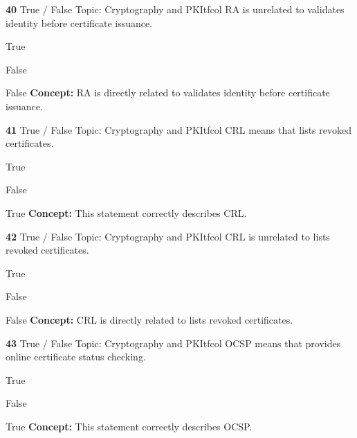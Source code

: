 \documentclass[10pt,a4paper]{article}
\begin{document}
\begin{qcard}{\color{white}\textbf{40} \hfill \small True / False \textbar{} Topic: Cryptography and PKI}{tfcol}
RA is unrelated to validates identity before certificate issuance.

\begin{qoptions}
\item True
\item False
\end{qoptions}
\begin{explainbox}{False}
\textbf{Concept:} RA is directly related to validates identity before certificate issuance.
\end{explainbox}
\end{qcard}

\begin{qcard}{\color{white}\textbf{41} \hfill \small True / False \textbar{} Topic: Cryptography and PKI}{tfcol}
CRL means that lists revoked certificates.

\begin{qoptions}
\item True
\item False
\end{qoptions}
\begin{explainbox}{True}
\textbf{Concept:} This statement correctly describes CRL.
\end{explainbox}
\end{qcard}

\begin{qcard}{\color{white}\textbf{42} \hfill \small True / False \textbar{} Topic: Cryptography and PKI}{tfcol}
CRL is unrelated to lists revoked certificates.

\begin{qoptions}
\item True
\item False
\end{qoptions}
\begin{explainbox}{False}
\textbf{Concept:} CRL is directly related to lists revoked certificates.
\end{explainbox}
\end{qcard}

\begin{qcard}{\color{white}\textbf{43} \hfill \small True / False \textbar{} Topic: Cryptography and PKI}{tfcol}
OCSP means that provides online certificate status checking.

\begin{qoptions}
\item True
\item False
\end{qoptions}
\begin{explainbox}{True}
\textbf{Concept:} This statement correctly describes OCSP.
\end{explainbox}
\end{qcard}
\end{document}
